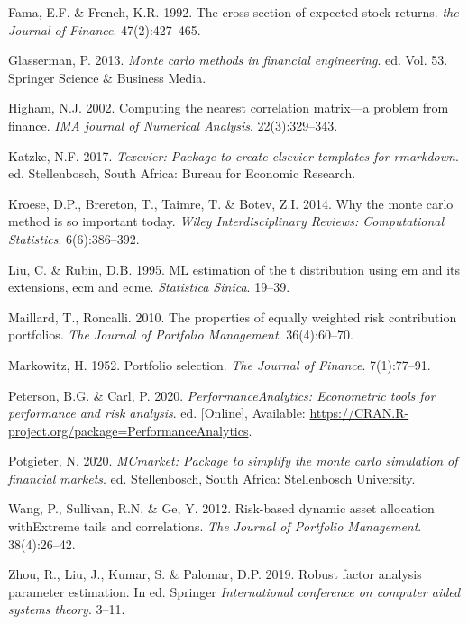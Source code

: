 \documentclass[11pt,preprint, authoryear]{elsarticle}
\numberwithin{equation}{section}
\numberwithin{figure}{section}
\numberwithin{table}{section}
\begin{document}
\leavevmode\hypertarget{ref-fama1992}{}%
Fama, E.F. \& French, K.R. 1992. The cross-section of expected stock
returns. \emph{the Journal of Finance}. 47(2):427--465.

\leavevmode\hypertarget{ref-glasserman2013}{}%
Glasserman, P. 2013. \emph{Monte carlo methods in financial
engineering}. ed. Vol. 53. Springer Science \& Business Media.

\leavevmode\hypertarget{ref-higham2002}{}%
Higham, N.J. 2002. Computing the nearest correlation matrix---a problem
from finance. \emph{IMA journal of Numerical Analysis}. 22(3):329--343.

\leavevmode\hypertarget{ref-Texevier}{}%
Katzke, N.F. 2017. \emph{Texevier: Package to create elsevier templates
for rmarkdown}. ed. Stellenbosch, South Africa: Bureau for Economic
Research.

\leavevmode\hypertarget{ref-kroese2014}{}%
Kroese, D.P., Brereton, T., Taimre, T. \& Botev, Z.I. 2014. Why the
monte carlo method is so important today. \emph{Wiley Interdisciplinary
Reviews: Computational Statistics}. 6(6):386--392.

\leavevmode\hypertarget{ref-liu1995}{}%
Liu, C. \& Rubin, D.B. 1995. ML estimation of the t distribution using
em and its extensions, ecm and ecme. \emph{Statistica Sinica}. 19--39.

\leavevmode\hypertarget{ref-maillard2010}{}%
Maillard, T., Roncalli. 2010. The properties of equally weighted risk
contribution portfolios. \emph{The Journal of Portfolio Management}.
36(4):60--70.

\leavevmode\hypertarget{ref-markowitz}{}%
Markowitz, H. 1952. Portfolio selection. \emph{The Journal of Finance}.
7(1):77--91.

\leavevmode\hypertarget{ref-PerformanceAnalytics}{}%
Peterson, B.G. \& Carl, P. 2020. \emph{PerformanceAnalytics: Econometric
tools for performance and risk analysis}. ed. {[}Online{]}, Available:
\url{https://CRAN.R-project.org/package=PerformanceAnalytics}.

\leavevmode\hypertarget{ref-MCmarket}{}%
Potgieter, N. 2020. \emph{MCmarket: Package to simplify the monte carlo
simulation of financial markets}. ed. Stellenbosch, South Africa:
Stellenbosch University.

\leavevmode\hypertarget{ref-wang2012}{}%
Wang, P., Sullivan, R.N. \& Ge, Y. 2012. Risk-based dynamic asset
allocation withExtreme tails and correlations. \emph{The Journal of
Portfolio Management}. 38(4):26--42.

\leavevmode\hypertarget{ref-zhou2019}{}%
Zhou, R., Liu, J., Kumar, S. \& Palomar, D.P. 2019. Robust factor
analysis parameter estimation. In ed. Springer \emph{International
conference on computer aided systems theory}. 3--11.
\end{document}
